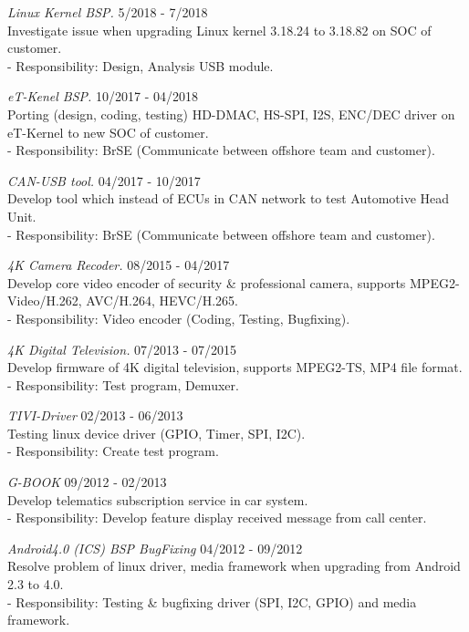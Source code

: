 \documentclass[margin]{res}
\begin{document}
\begin{resume}
                {\sl Linux Kernel BSP.} \hfill            5/2018 - 7/2018 \\
		 Investigate issue when upgrading Linux kernel 3.18.24 to 3.18.82 on SOC of customer.\\
		 - Responsibility: Design, Analysis USB module.

                {\sl eT-Kenel BSP.} \hfill            10/2017 - 04/2018 \\
		 Porting (design, coding, testing) HD-DMAC, HS-SPI, I2S, ENC/DEC driver on eT-Kernel to new SOC of customer.\\
		 - Responsibility: BrSE (Communicate between offshore team and customer).


                {\sl CAN-USB tool.} \hfill            04/2017 - 10/2017 \\
		 Develop tool which instead of ECUs in CAN network to test Automotive Head Unit.\\
		 - Responsibility: BrSE (Communicate between offshore team and customer).

                {\sl 4K Camera Recoder.} \hfill            08/2015 - 04/2017 \\
		 Develop core video encoder of security \& professional camera, supports MPEG2-Video/H.262, AVC/H.264, HEVC/H.265.\\
		 - Responsibility: Video encoder (Coding, Testing, Bugfixing).
   

                {\sl 4K Digital Television.} \hfill            07/2013 - 07/2015 \\
		 Develop firmware of 4K digital television, supports MPEG2-TS, MP4 file format.\\
		 - Responsibility: Test program, Demuxer.

                {\sl TIVI-Driver} \hfill            02/2013 - 06/2013 \\
		 Testing linux device driver (GPIO, Timer, SPI, I2C).\\
		 - Responsibility: Create test program.

                {\sl G-BOOK} \hfill            09/2012 - 02/2013 \\
		 Develop telematics subscription service in car system.\\
		 - Responsibility: Develop feature display received message from call center.


                {\sl Android4.0 (ICS) BSP BugFixing} \hfill            04/2012 - 09/2012\\
		 Resolve problem of linux driver, media framework when upgrading from Android 2.3 to 4.0.\\
		 - Responsibility: Testing \& bugfixing driver (SPI, I2C, GPIO) and media framework.



\end{resume}
\end{document}
